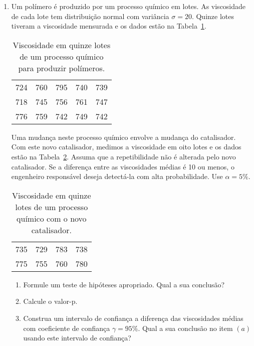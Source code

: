 \documentclass[8pt, a4paper]{article}
\begin{document}
\begin{enumerate}
	\item Um polímero é produzido por um processo químico em lotes. As viscosidade de cada lote tem distribuição normal com variância $\sigma = 20$. Quinze lotes tiveram a viscosidade mensurada e os dados estão na Tabela~\ref{tab:polimero-viscosidade-1}.
	\begin{table}[ht]
		\centering
		\begin{tabular}{ccccc}
			\toprule[0.05cm]
			724 & 760 & 795 & 740 & 739 \\ 
			718 & 745 & 756 & 761 & 747 \\ 
			776 & 759 & 742 & 749 & 742 \\ 
			\bottomrule[0.05cm]
		\end{tabular}
		\caption{Viscosidade em quinze lotes de um processo químico para produzir polímeros.} 
		\label{tab:polimero-viscosidade-1}
	\end{table} 
	Uma mudança neste processo químico envolve a mudança do catalisador. Com este novo catalisador, medimos a viscosidade em oito lotes e os dados estão na Tabela~\ref{tab:polimero-viscosidade-2}. Assuma que a repetibilidade não é alterada pelo novo catalisador. Se a diferença entre as viscosidades médias é 10 ou menos, o engenheiro responsável deseja detectá-la com alta probabilidade. Use $\alpha=5\%$.
	\begin{table}[ht]
		\centering
		\begin{tabular}{cccc}
			\toprule[0.05cm]
			735 & 729 & 783 & 738 \\ 
			775 & 755 & 760 & 780 \\ 
			\bottomrule[0.05cm]
		\end{tabular}
		\caption{Viscosidade em quinze lotes de um processo químico com o novo catalisador.} 
		\label{tab:polimero-viscosidade-2}
	\end{table}
	\begin{enumerate}
		\item Formule um teste de hipóteses apropriado. Qual a sua conclusão?
		\item Calcule o valor-p.
		\item Construa um intervalo de confiança a diferença das viscosidades médias com coeficiente de confiança $\gamma=95\%$. Qual a sua conclusão no item $(a)$ usando este intervalo de confiança?
	\end{enumerate}


\end{enumerate}
\end{document}
